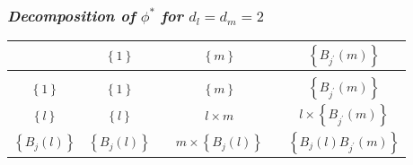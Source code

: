 \documentclass[12pt]{beamer}
\newcommand{\ms}{\scriptscriptstyle}
\begin{document}
\begin{frame}
\frametitle{\emph{Decomposition of} $\phi^*$ \emph{for} $d_l = d_m = 2$}


\begin{table}[h]
\centering %
\begin{tabular}{c|ccccc}
	&    $\left\{ 1 \right\}$	&&	$\left\{m \right\}$	 	&& 	$\left\{ B_{\ms{j^\prime}}\left(m\right) \right\} $ \\ [0.5ex]
\hline %
\\
$\left\{ 1 \right\}$ 				&  $\left\{ 1 \right\}$   	& &	$\left\{m \right\}$	 	&& 	$\left\{ B_{\ms{j^\prime}}\left(m\right) \right\} $	\\  [2.5ex] %
$\left\{l \right\}$		 		&  $\left\{ l \right\}$  	 &&	$l \times m$	 	&& 	$l \times \left\{   B_{\ms{j^\prime}}\left(m\right) \right\} $\\  [2.5ex]
$\left\{ B_j\left(l\right) \right\} $	 	&    $\left\{ B_j\left(l\right) \right\}$	&&	$ m \times \left\{ B_j\left(l\right) \right\}$	& &	$\left\{ B_j\left(l\right) B_{\ms{j^\prime}}\left(m\right) \right\}$ 
\end{tabular}
\end{table}

\end{frame}
\end{document}

